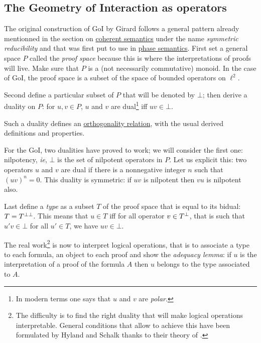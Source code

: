 \subsection{The Geometry of Interaction as operators}\label{the-geometry-of-interaction-as-operators}

The original construction of GoI by Girard follows a general pattern
already mentionned in the section on \hyperref[coherent-semantics]{coherent
semantics} under the name \emph{symmetric reducibility} and that was
first put to use in \hyperref[phase-semantics]{phase semantics}. First set a
general space \(P\) called the \emph{proof space} because this is where
the interpretations of proofs will live. Make sure that \(P\) is a (not
necessarily commutative) monoid. In the case of GoI, the proof space is
a subset of the space of bounded operators on \(\ell^2\).

Second define a particular subset of \(P\) that will be denoted by
\(\bot\); then derive a duality on \(P\): for \(u,v\in P\), \(u\) and
\(v\) are dual\footnote{In modern terms one says that \(u\) and \(v\)
  are \emph{polar}.} iff \(uv\in\bot\).

Such a duality defines an \hyperref[orthogonality-relation]{orthogonality relation}, with the usual derived definitions and properties.

For the GoI, two dualities have proved to work; we will consider the
first one: nilpotency, \emph{ie}, \(\bot\) is the set of nilpotent
operators in \(P\). Let us explicit this: two operators \(u\) and \(v\)
are dual if there is a nonnegative integer \(n\) such that
\((uv)^n = 0\). This duality is symmetric: if \(uv\) is nilpotent then
\(vu\) is nilpotent also.

Last define a \emph{type} as a subset \(T\) of the proof space that is
equal to its bidual: \(T = T^{\bot\bot}\). This means that \(u\in T\) iff
for all operator \(v\in T^\bot\), that is such that \(u'v\in\bot\) for
all \(u'\in T\), we have \(uv\in\bot\).

The real work\footnote{The difficulty is to find the right duality that
  will make logical operations interpretable. General conditions that
  allow to achieve this have been formulated by Hyland and Schalk
  thanks to their theory of \emph{}.}
is now to interpret logical operations, that is to
associate a type to each formula, an object to each proof and show the
\emph{adequacy lemma}: if \(u\) is the interpretation of a proof of the
formula \(A\) then \(u\) belongs to the type associated to \(A\).

